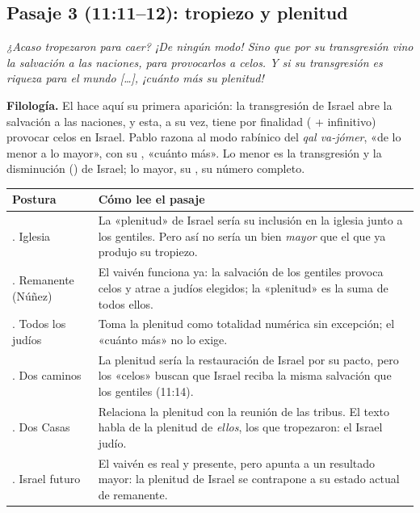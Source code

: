 \subsection{Pasaje 3 (11:11--12): tropiezo y plenitud}

\begin{cita}[fontupper=\upshape]
\par\smallskip
\itshape ¿Acaso tropezaron para caer? ¡De ningún modo! Sino que por su transgresión vino la salvación a las naciones, para provocarlos a celos. Y si su transgresión es riqueza para el mundo [\ldots], ¡cuánto más su plenitud!
\end{cita}

\textbf{Filología.} El  hace aquí su primera aparición: la transgresión de Israel abre la salvación a las naciones, y esta, a su vez, tiene por finalidad ( + infinitivo) provocar celos en Israel. Pablo razona al modo rabínico del \emph{qal va-jómer}, «de lo menor a lo mayor», con su , «cuánto más». Lo menor es la transgresión y la disminución () de Israel; lo mayor, su , su número completo.

\begin{center}\footnotesize
\renewcommand{\arraystretch}{1.25}
\begin{tabular}{>{\RaggedRight\arraybackslash}p{2.9cm}>{\RaggedRight\arraybackslash}p{11.1cm}}
\toprule
\textbf{Postura} & \textbf{Cómo lee el pasaje}\\
\midrule
1. Iglesia & La «plenitud» de Israel sería su inclusión en la iglesia junto a los gentiles. Pero así no sería un bien \emph{mayor} que el que ya produjo su tropiezo.\\
2. Remanente (Núñez) & El vaivén funciona ya: la salvación de los gentiles provoca celos y atrae a judíos elegidos; la «plenitud» es la suma de todos ellos.\\
3. Todos los judíos & Toma la plenitud como totalidad numérica sin excepción; el «cuánto más» no lo exige.\\
4. Dos caminos & La plenitud sería la restauración de Israel por su pacto, pero los «celos» buscan que Israel reciba la misma salvación que los gentiles (11:14).\\
5. Dos Casas & Relaciona la plenitud con la reunión de las tribus. El texto habla de la plenitud de \emph{ellos}, los que tropezaron: el Israel judío.\\
6. Israel futuro & El vaivén es real y presente, pero apunta a un resultado mayor: la plenitud de Israel se contrapone a su estado actual de remanente.\\
\bottomrule
\end{tabular}\end{center}

